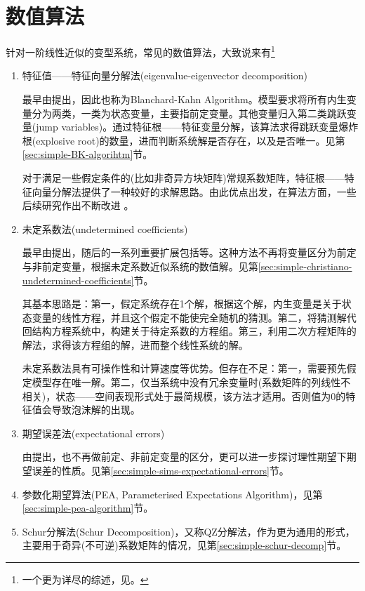 \section{数值算法}
针对一阶线性近似的变型系统，常见的数值算法，大致说来有\footnote{一个更为详尽的综述，见\citep{Milani:2012jt}。}
\begin{enumerate}
  \item 特征值——特征向量分解法(eigenvalue-eigenvector decomposition)

  最早由\cite{Blanchard:1980gi}提出，因此也称为Blanchard-Kahn Algorithm。模型要求将所有内生变量分为两类，一类为状态变量，主要指前定变量。其他变量归入第二类跳跃变量(jump variables)。通过特征根——特征变量分解，该算法求得跳跃变量爆炸根(explosive root)的数量，进而判断系统解是否存在，以及是否唯一。见第\ref{sec:simple-BK-algorihtm}节。

  对于满足一些假定条件的(比如非奇异方块矩阵)常规系数矩阵，特征根——特征向量分解法提供了一种较好的求解思路。由此优点出发，在算法方面，一些后续研究作出不断改进
  \citep{King:1998hm, King:2002ko, Anderson:1985hh, Anderson:1998dp, Sims:2002jc, Klein:2000bc, Soderlind:1999kg}。
  \item 未定系数法(undetermined coefficients)

  最早由\cite{McCallum:1983fz}提出，随后的一系列重要扩展包括\cite{Uhlig:1999vx, Binder:1995uf, Christiano:2002uk}等。这种方法不再将变量区分为前定与非前定变量，根据未定系数近似系统的数值解。见第\ref{sec:simple-christiano-undetermined-coefficients}节。

  其基本思路是：第一，假定系统存在1个解，根据这个解，内生变量是关于状态变量的线性方程，并且这个假定不能使完全随机的猜测。第二，将猜测解代回结构方程系统中，构建关于待定系数的方程组。第三，利用二次方程矩阵的解法，求得该方程组的解，进而整个线性系统的解。

  未定系数法具有可操作性和计算速度等优势。但存在不足：第一，需要预先假定模型存在唯一解。第二，仅当系统中没有冗余变量时(系数矩阵的列线性不相关)，状态——空间表现形式处于最简规模，该方法才适用。否则值为0的特征值会导致泡沫解的出现\citep[p.57]{Canova:2011vi}。
  \item 期望误差法(expectational errors)

  由\cite{Sims:2002jc}提出，也不再做前定、非前定变量的区分，更可以进一步探讨理性期望下期望误差的性质。见第\ref{sec:simple-sims-expectational-errors}节。

  \item 参数化期望算法(PEA, Parameterised Expectations Algorithm)，见第\ref{sec:simple-pea-algorithm}节。

  \item Schur分解法(Schur Decomposition)，又称QZ分解法，作为更为通用的形式，主要用于奇异(不可逆)系数矩阵的情况\citep{King:1998hm, King:2002ko, Soderlind:1999kg, Klein:2000bc}，见第\ref{sec:simple-schur-decomp}节。

\end{enumerate}

